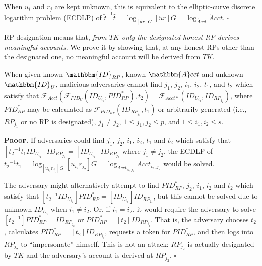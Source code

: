 When $u_{i}$ and $r_{j}$ are kept unknown, this is equivalent to the elliptic-curve discrete logarithm problem (ECDLP) of $\check{t}^{-1}\hat{t} = \log_{[\hat{u}r]G}{[\check{u}r]G} = \log_{\hat{A}cct}{\check{A}cct}$.
\hfill $\square$

\vspace{1.5mm}

RP designation means that, \emph{from $TK$ only the designated honest RP derives meaningful accounts}.
We prove it by showing that,
    at any honest RPs other than the designated one, no meaningful account will be derived from $TK$.


\vspace{1.5mm}
\begin{thm}[RP Designation]
When given known $\mathbbm{ID}_{RP}$, known $\mathbbm{A}cct$ and unknown $\mathbbm{ID}_U$,
 malicious adversaries cannot find ${j_1}$, ${j_2}$, ${i_1}$, ${i_2}$, $t_1$, and $t_2$ which satisfy that $\mathcal{F}_{Acct}(\mathcal{F}_{PID_U}(ID_{U_{i_1}}, PID_{RP}^{*}), t_2) = \mathcal{F}_{Acct\ast}(ID_{U_{i_2}}, ID_{RP_{j_2}})$,
where $PID_{RP}^{*}$ may be calculated as $\mathcal{F}_{PID_{RP}}(ID_{RP_{j_1}}, t_1)$
    or arbitrarily generated (i.e., $RP_{j_1}$ or no RP is designated),
    ${j_1} \neq {j_2}$, $1 \leq j_1, j_2 \leq p$, and $1 \leq i_1, i_2 \leq s$.
\label{thm-rp-designation}
\end{thm}


\noindent\textbf{\textsc{Proof.}} 
If adversaries could find ${j_1}$, ${j_2}$, ${i_1}$, ${i_2}$, $t_1$ and $t_2$ which satisfy that $[{t_2}^{-1}t_1ID_{U_{i_1}}]ID_{RP_{j_1}} = [ID_{U_{i_2}}]ID_{RP_{j_2}}$
 where ${j_1} \neq {j_2}$,
 the ECDLP of ${t_2}^{-1}t_1 = \log_{[{u_{i_1}}{r_{j_1}}]G}{[{u_{i_2}}{r_{j_2}}]G}
 = \log_{Acct_{i_1,j_1}}{Acct_{i_2,j_2}}$ would be solved.

The adversary might alternatively attempt to find $PID_{RP}^{*}$, ${j_2}$, ${i_1}$, ${i_2}$ and $t_2$ which satisfy that $[{{t_2}^{-1}}ID_{U_{i_1}}]PID_{RP}^{*} = [ID_{U_{i_2}}]ID_{RP_{j_2}}$,
        but this cannot be solved due to unknown $ID_{U_{i}}$ when ${i_1} \neq {i_2}$.
Or, if ${i_1} = {i_2}$, 
    it would require the adversary to solve $[{{t_2}^{-1}}]PID_{RP}^{*} = ID_{RP_{j_2}}$
        or $PID_{RP}^{*} = [t_2]ID_{RP_{j_2}}$.
That is,
    the adversary chooses $t_2$, calculates $PID_{RP}^{*} = [t_2]ID_{RP_{j_2}}$, requests a token for $PID_{RP}^{*}$, and then logs into $RP_{j_2}$ to ``impersonate'' himself.
This is not an attack: $RP_{j_2}$ is actually designated by $TK$ and the adversary's account is derived at $RP_{j_2}$.
\hfill $\square$

